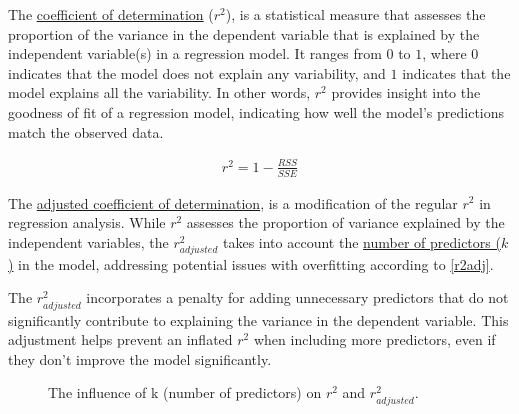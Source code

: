 \documentclass[
  a4paper,
]{scrbook}
\begin{document}
The \hyperref[r2]{coefficient of determination} (\(r^2\)), is a
statistical measure that assesses the proportion of the variance in the
dependent variable that is explained by the independent variable(s) in a
regression model. It ranges from \(0\) to \(1\), where \(0\) indicates
that the model does not explain any variability, and \(1\) indicates
that the model explains all the variability. In other words, \(r^2\)
provides insight into the goodness of fit of a regression model,
indicating how well the model's predictions match the observed data.

\begin{align}
r^2 = 1- \frac{RSS}{SSE} \label{r2}
\end{align}

The \hyperref[r2adj]{adjusted coefficient of determination}, is a
modification of the regular \(r^2\) in regression analysis. While
\(r^2\) assesses the proportion of variance explained by the independent
variables, the \(r^2_{adjusted}\) takes into account the
\hyperref[numpred]{number of predictors (\(k\))} in the model,
addressing potential issues with overfitting according to \eqref{r2adj}.

The \(r^2_{adjusted}\) incorporates a penalty for adding unnecessary
predictors that do not significantly contribute to explaining the
variance in the dependent variable. This adjustment helps prevent an
inflated \(r^2\) when including more predictors, even if they don't
improve the model significantly.

\begin{figure}[H]


\caption{\label{fig-r2vsr2adj}The influence of k (number of predictors)
on \(r^2\) and \(r^2_{adjusted}\).}

\end{figure}%
\end{document}
